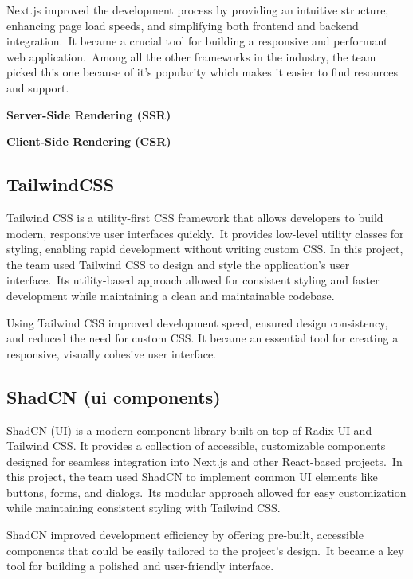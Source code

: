 Next.js improved the development process by providing an intuitive structure, enhancing page load speeds, and simplifying both frontend and backend integration.\ It became a crucial tool for building a responsive and performant web application.\ Among all the other frameworks in the industry, the team picked this one because of it's popularity which makes it easier to find resources and support.

\textbf{Server-Side Rendering (SSR)}\label{subsubsec:server-side-rendering-(ssr)}


\textbf{Client-Side Rendering (CSR)}\label{subsubsec:client-side-rendering-(csr)}


\subsection{TailwindCSS}\label{subsec:tailwindcss}

Tailwind CSS is a utility-first CSS framework that allows developers to build modern, responsive user interfaces quickly.\ It provides low-level utility classes for styling, enabling rapid development without writing custom CSS. In this project, the team used Tailwind CSS to design and style the application's user interface.\ Its utility-based approach allowed for consistent styling and faster development while maintaining a clean and maintainable codebase.\cite[TailwindCSS]{tailwind}

Using Tailwind CSS improved development speed, ensured design consistency, and reduced the need for custom CSS. It became an essential tool for creating a responsive, visually cohesive user interface.



\subsection{ShadCN (ui components)}\label{subsec:shadcn-(ui-components)}

ShadCN (UI) is a modern component library built on top of Radix UI and Tailwind CSS. It provides a collection of accessible, customizable components designed for seamless integration into Next.js and other React-based projects.\ In this project, the team used ShadCN to implement common UI elements like buttons, forms, and dialogs.\ Its modular approach allowed for easy customization while maintaining consistent styling with Tailwind CSS\@.\cite[ShadCN]{shadcn}

ShadCN improved development efficiency by offering pre-built, accessible components that could be easily tailored to the project’s design.\ It became a key tool for building a polished and user-friendly interface.

